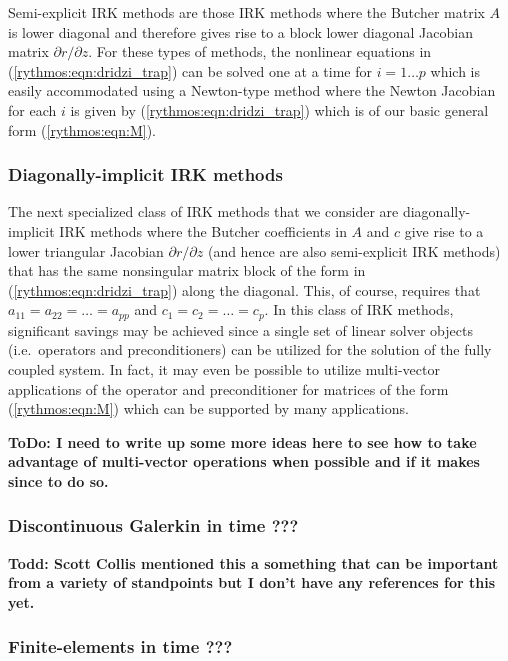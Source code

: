 \documentclass[pdf,ps2pdf,11pt]{SANDreport}
\begin{document}
Semi-explicit IRK methods are those IRK methods where the Butcher matrix $A$
is lower diagonal and therefore gives rise to a block lower diagonal Jacobian
matrix ${}\partial r / {}\partial z$.  For these types of methods, the
nonlinear equations in (\ref{rythmos:eqn:dridzi_trap}) can be solved one at a
time for $i = 1 {}\ldots p$ which is easily accommodated using a Newton-type
method where the Newton Jacobian for each $i$ is given by
(\ref{rythmos:eqn:dridzi_trap}) which is of our basic general form
(\ref{rythmos:eqn:M}).

\subsubsection*{Diagonally-implicit IRK methods}

The next specialized class of IRK methods that we consider are
diagonally-implicit IRK methods where the Butcher coefficients in $A$ and $c$
give rise to a lower triangular Jacobian ${}\partial r / {}\partial z$ (and
hence are also semi-explicit IRK methods) that has the same nonsingular matrix
block of the form in (\ref{rythmos:eqn:dridzi_trap}) along the diagonal.
This, of course, requires that $a_{11} = a_{22} = {}\ldots = a_{pp}$ and
$c_{1} = c_{2} = {}\ldots = c_{p}$.  In this class of IRK methods, significant
savings may be achieved since a single set of linear solver objects (i.e.\
operators and preconditioners) can be utilized for the solution of the fully
coupled system.  In fact, it may even be possible to utilize multi-vector
applications of the operator and preconditioner for matrices of the form
(\ref{rythmos:eqn:M}) which can be supported by many applications.

{}\textbf{ToDo: I need to write up some more ideas here to see how to take
advantage of multi-vector operations when possible and if it makes since to do
so.}

\subsubsection{Discontinuous Galerkin in time ???}

{}\textbf{Todd: Scott Collis mentioned this a something that can be important
from a variety of standpoints but I don't have any references for this yet.}

\subsubsection{Finite-elements in time ???}
\end{document}
